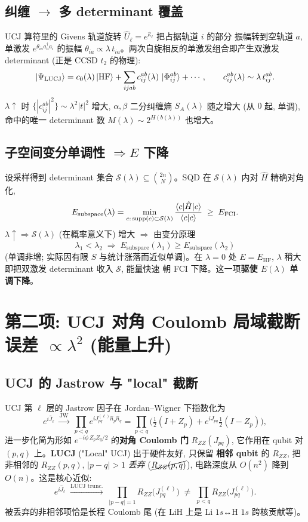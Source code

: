 \documentclass[11pt]{article}
\begin{document}
\subsection*{纠缠 $\to$ 多 determinant 覆盖}
UCJ 算符里的 Givens 轨道旋转 $\hat U_\ell=e^{\hat\kappa_\ell}$ 把占据轨道 $i$ 的部分
振幅转到空轨道 $a$, 单激发 $e^{\theta_{ia}a^\dagger_a a_i}$ 的振幅
$\theta_{ia}\propto\lambda\,t_{ia}$。两次自旋相反的单激发组合即产生双激发 determinant
(正是 CCSD $t_2$ 的物理):
\[
  \ket{\Psi_{\text{LUCJ}}}
  =c_0(\lambda)\ket{\text{HF}}
  +\sum_{ijab}c_{ij}^{ab}(\lambda)\,\ket{\Phi_{ij}^{ab}}+\cdots,
  \qquad c_{ij}^{ab}(\lambda)\sim\lambda\,t_{ij}^{ab}.
\]
$\lambda\!\uparrow$ 时 $\{|c_{ij}^{ab}|^2\}\sim\lambda^2|t|^2$ 增大,
$\alpha,\beta$ 二分纠缠熵 $S_A(\lambda)$ 随之增大 (从 $0$ 起, 单调), 命中的唯一
determinant 数 $M(\lambda)\sim 2^{H(b(\lambda))}$ 也增大。

\subsection*{子空间变分单调性 $\Rightarrow E$ 下降}
设采样得到 determinant 集合 $\mathcal{S}(\lambda)\subseteq\binom{2n}{N}$。SQD 在
$\mathcal{S}(\lambda)$ 内对 $\hat H$ 精确对角化,
\[
  E_{\text{subspace}}(\lambda)=\min_{c:\,\mathrm{supp}(c)\subset\mathcal{S}(\lambda)}
  \frac{\braket{c|\hat H|c}}{\braket{c|c}}\;\geq\;E_{\text{FCI}} .
\]
$\lambda\!\uparrow\Rightarrow\mathcal{S}(\lambda)$ (在概率意义下) 增大
$\Rightarrow$ 由变分原理
\[
  \boxed{\;\lambda_1<\lambda_2\;\Longrightarrow\;
  E_{\text{subspace}}(\lambda_1)\geq E_{\text{subspace}}(\lambda_2)\;}
\]
(单调非增; 实际因有限 $S$ 与统计涨落而近似单调)。在 $\lambda=0$ 处
$E=E_{\text{HF}}$, $\lambda$ 稍大即把双激发 determinant 收入 $\mathcal{S}$, 能量快速
朝 FCI 下降。这一项\textbf{驱使 $E(\lambda)$ 单调下降}。

\section{\texorpdfstring{第二项: UCJ 对角 Coulomb 局域截断误差 $\propto\lambda^2$ (能量上升)}{第二项: UCJ 对角 Coulomb 局域截断误差 (proportional lambda-squared, 能量上升)}}
\subsection*{UCJ 的 Jastrow 与 "local" 截断}
UCJ 第 $\ell$ 层的 Jastrow 因子在 Jordan--Wigner 下指数化为
\[
  e^{i\hat J_\ell}\;\xrightarrow{\text{JW}}\;
  \prod_{p<q}e^{iJ^{(\ell)}_{pq}\hat n_p\hat n_q}
  =\prod_{p<q}\Big(\tfrac{1}{2}(I+Z_p)+e^{iJ_{pq}}\tfrac{1}{2}(I-Z_p)\Big),
\]
进一步化简为形如 $e^{-i\phi\,Z_pZ_q/2}$ 的\textbf{对角 Coulomb 门} $R_{ZZ}(J_{pq})$,
它作用在 qubit 对 $(p,q)$ 上。\textbf{LUCJ} ("Local" UCJ) 出于硬件友好, 只保留
\textbf{相邻 qubit} 的 $R_{ZZ}$, 把非相邻的 $R_{ZZ}(p,q),\,|p-q|>1$ \emph{丢弃}
($\cancel{R_{ZZ}(p,q)}$), 电路深度从 $O(n^2)$ 降到 $O(n)$。这是核心近似:
\[
  e^{i\hat J_\ell}\;\xrightarrow{\text{LUCJ trunc.}}\;
  \prod_{|p-q|=1}R_{ZZ}\!\big(J^{(\ell)}_{pq}\big)
  \;\neq\;\prod_{p<q}R_{ZZ}\!\big(J^{(\ell)}_{pq}\big) .
\]
被丢弃的非相邻项恰是长程 Coulomb 尾 (在 LiH 上是 Li $1s$↔H $1s$ 跨核贡献等)。
\end{document}

